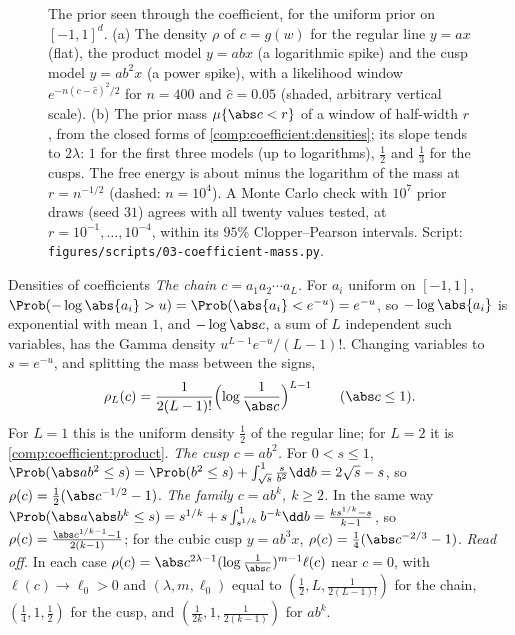 \begin{refsection}
\begin{figure}[t]
\caption{The prior seen through the coefficient, for the uniform prior on $[-1,1]^d$. (a) The density $\rho$ of $c=g(w)$ for the regular line $y=ax$ (flat), the product model $y=abx$ (a logarithmic spike) and the cusp model $y=ab^2x$ (a power spike), with a likelihood window $e^{-n(c-\hat c)^2/2}$ for $n=400$ and $\hat c=0.05$ (shaded, arbitrary vertical scale). (b) The prior mass $\mu\{\abs c<r\}$ of a window of half-width $r$, from the closed forms of \cref{comp:coefficient:densities}; its slope tends to $2\lambda$: $1$ for the first three models (up to logarithms), $\frac12$ and $\frac13$ for the cusps. The free energy is about minus the logarithm of the mass at $r=n^{-1/2}$ (dashed: $n=10^4$). A Monte Carlo check with $10^7$ prior draws (seed $31$) agrees with all twenty values tested, at $r=10^{-1},\dots,10^{-4}$, within its $95\%$ Clopper--Pearson intervals. Script: \texttt{figures/scripts/03-coefficient-mass.py}.}\label{fig:coefficient:densities}
\end{figure}

\begin{computation}{Densities of coefficients}\label{comp:coefficient:densities}
\step \emph{The chain $c=a_1a_2\cdots a_L$.} For $a_i$ uniform on $[-1,1]$, $\Prob(-\log\abs{a_i}>u)=\Prob(\abs{a_i}<e^{-u})=e^{-u}$, so $-\log\abs{a_i}$ is exponential with mean $1$, and $-\log\abs c$, a sum of $L$ independent such variables, has the Gamma density $u^{L-1}e^{-u}/(L-1)!$. Changing variables to $s=e^{-u}$, and splitting the mass between the signs,
\[
\rho_L(c)=\frac1{2(L-1)!}\Bigl(\log\frac1{\abs c}\Bigr)^{L-1}\qquad(\abs c\le1).
\]
For $L=1$ this is the uniform density $\frac12$ of the regular line; for $L=2$ it is \cref{comp:coefficient:product}.
\step \emph{The cusp $c=ab^2$.} For $0<s\le1$, $\Prob(\abs ab^2\le s)=\Prob(b^2\le s)+\int_{\sqrt s}^1\frac s{b^2}\dd b=2\sqrt s-s$, so $\rho(c)=\frac12(\abs c^{-1/2}-1)$.
\step \emph{The family $c=ab^k$, $k\ge2$.} In the same way $\Prob(\abs a\abs b^k\le s)=s^{1/k}+s\int_{s^{1/k}}^1b^{-k}\dd b=\frac{ks^{1/k}-s}{k-1}$, so $\rho(c)=\frac{\abs c^{1/k-1}-1}{2(k-1)}$; for the cubic cusp $y=ab^3x$, $\rho(c)=\frac14(\abs c^{-2/3}-1)$.
\step \emph{Read off.} In each case $\rho(c)=\abs c^{2\lambda-1}(\log\frac1{\abs c})^{m-1}\ell(c)$ near $c=0$, with $\ell(c)\to\ell_0>0$ and $(\lambda,m,\ell_0)$ equal to $(\frac12,L,\frac1{2(L-1)!})$ for the chain, $(\frac14,1,\frac12)$ for the cusp, and $(\frac1{2k},1,\frac1{2(k-1)})$ for $ab^k$.
\end{computation}


\end{refsection}
